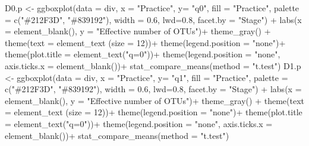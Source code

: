 \documentclass[]{interact}
\theoremstyle{plain}%
\theoremstyle{definition}
\theoremstyle{remark}
\newenvironment{Shaded}{\begin{snugshade}}{\end{snugshade}}
\newcommand{\AttributeTok}[1]{\textcolor[rgb]{0.77,0.63,0.00}{#1}}
\newcommand{\DecValTok}[1]{\textcolor[rgb]{0.00,0.00,0.81}{#1}}
\newcommand{\FloatTok}[1]{\textcolor[rgb]{0.00,0.00,0.81}{#1}}
\newcommand{\FunctionTok}[1]{\textcolor[rgb]{0.00,0.00,0.00}{#1}}
\newcommand{\NormalTok}[1]{#1}
\newcommand{\OtherTok}[1]{\textcolor[rgb]{0.56,0.35,0.01}{#1}}
\newcommand{\SpecialCharTok}[1]{\textcolor[rgb]{0.00,0.00,0.00}{#1}}
\newcommand{\StringTok}[1]{\textcolor[rgb]{0.31,0.60,0.02}{#1}}
\begin{document}
\begin{Shaded}
\begin{Highlighting}[]
\NormalTok{D0.p }\OtherTok{\textless{}{-}} \FunctionTok{ggboxplot}\NormalTok{(}\AttributeTok{data =}\NormalTok{ div, }\AttributeTok{x =} \StringTok{"Practice"}\NormalTok{, }\AttributeTok{y=} \StringTok{"q0"}\NormalTok{,}
                  \AttributeTok{fill =} \StringTok{"Practice"}\NormalTok{, }\AttributeTok{palette =} \FunctionTok{c}\NormalTok{(}\StringTok{"\#212F3D"}\NormalTok{, }\StringTok{"\#839192"}\NormalTok{), }
                  \AttributeTok{width =} \FloatTok{0.6}\NormalTok{, }\AttributeTok{lwd=}\FloatTok{0.8}\NormalTok{, }\AttributeTok{facet.by =} \StringTok{"Stage"}\NormalTok{)  }\SpecialCharTok{+}
  \FunctionTok{labs}\NormalTok{(}\AttributeTok{x =} \FunctionTok{element\_blank}\NormalTok{(), }\AttributeTok{y =} \StringTok{"Effective number of OTUs"}\NormalTok{)}\SpecialCharTok{+}
  \FunctionTok{theme\_gray}\NormalTok{() }\SpecialCharTok{+}
  \FunctionTok{theme}\NormalTok{(}\AttributeTok{text =} \FunctionTok{element\_text}\NormalTok{ (}\AttributeTok{size =} \DecValTok{12}\NormalTok{))}\SpecialCharTok{+}
  \FunctionTok{theme}\NormalTok{(}\AttributeTok{legend.position =} \StringTok{"none"}\NormalTok{)}\SpecialCharTok{+}
  \FunctionTok{theme}\NormalTok{(}\AttributeTok{plot.title =} \FunctionTok{element\_text}\NormalTok{(}\StringTok{"q=0"}\NormalTok{))}\SpecialCharTok{+}
  \FunctionTok{theme}\NormalTok{(}\AttributeTok{legend.position =} \StringTok{"none"}\NormalTok{,}
        \AttributeTok{axis.ticks.x =} \FunctionTok{element\_blank}\NormalTok{())}\SpecialCharTok{+}
  \FunctionTok{stat\_compare\_means}\NormalTok{(}\AttributeTok{method =} \StringTok{"t.test"}\NormalTok{)}
\NormalTok{D1.p }\OtherTok{\textless{}{-}} \FunctionTok{ggboxplot}\NormalTok{(}\AttributeTok{data =}\NormalTok{ div, }\AttributeTok{x =} \StringTok{"Practice"}\NormalTok{, }\AttributeTok{y=} \StringTok{"q1"}\NormalTok{,}
                  \AttributeTok{fill =} \StringTok{"Practice"}\NormalTok{, }\AttributeTok{palette =} \FunctionTok{c}\NormalTok{(}\StringTok{"\#212F3D"}\NormalTok{, }\StringTok{"\#839192"}\NormalTok{), }
                  \AttributeTok{width =} \FloatTok{0.6}\NormalTok{, }\AttributeTok{lwd=}\FloatTok{0.8}\NormalTok{, }\AttributeTok{facet.by =} \StringTok{"Stage"}\NormalTok{)  }\SpecialCharTok{+}
  \FunctionTok{labs}\NormalTok{(}\AttributeTok{x =} \FunctionTok{element\_blank}\NormalTok{(), }\AttributeTok{y =} \StringTok{"Effective number of OTUs"}\NormalTok{)}\SpecialCharTok{+}
  \FunctionTok{theme\_gray}\NormalTok{() }\SpecialCharTok{+}
  \FunctionTok{theme}\NormalTok{(}\AttributeTok{text =} \FunctionTok{element\_text}\NormalTok{ (}\AttributeTok{size =} \DecValTok{12}\NormalTok{))}\SpecialCharTok{+}
  \FunctionTok{theme}\NormalTok{(}\AttributeTok{legend.position =} \StringTok{"none"}\NormalTok{)}\SpecialCharTok{+}
  \FunctionTok{theme}\NormalTok{(}\AttributeTok{plot.title =} \FunctionTok{element\_text}\NormalTok{(}\StringTok{"q=0"}\NormalTok{))}\SpecialCharTok{+}
  \FunctionTok{theme}\NormalTok{(}\AttributeTok{legend.position =} \StringTok{"none"}\NormalTok{,}
        \AttributeTok{axis.ticks.x =} \FunctionTok{element\_blank}\NormalTok{())}\SpecialCharTok{+}
  \FunctionTok{stat\_compare\_means}\NormalTok{(}\AttributeTok{method =} \StringTok{"t.test"}\NormalTok{)}


\end{Highlighting}
\end{Shaded}
\end{document}
